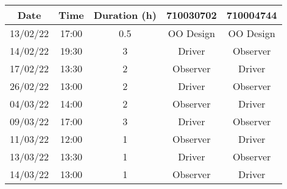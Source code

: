 \documentclass{article}
\begin{document}
    \begin{center}

        \begin{tabular}{ | c | c | c | c | c | }
            \hline

                Date & Time & Duration (h) & 710030702 & 710004744 \\
            
            \hline

                13/02/22 & 17:00 & 0.5 & OO Design & OO Design \\

            \hline

                14/02/22 & 19:30 & 3 & Driver & Observer \\

            \hline

                17/02/22 & 13:30 & 2 & Observer & Driver \\

            \hline

                26/02/22 & 13:00 & 2 & Driver & Observer \\

            \hline

                04/03/22 & 14:00 & 2 & Observer & Driver \\

            \hline

                09/03/22 & 17:00 & 3 & Driver & Observer \\

            \hline

                11/03/22 & 12:00 & 1 & Observer & Driver \\

            \hline

                13/03/22 & 13:30 & 1 & Driver & Observer \\

            \hline

                14/03/22 & 13:00 & 1 & Observer & Driver \\

            \hline

        \end{tabular}
    \end{center}
\end{document}
